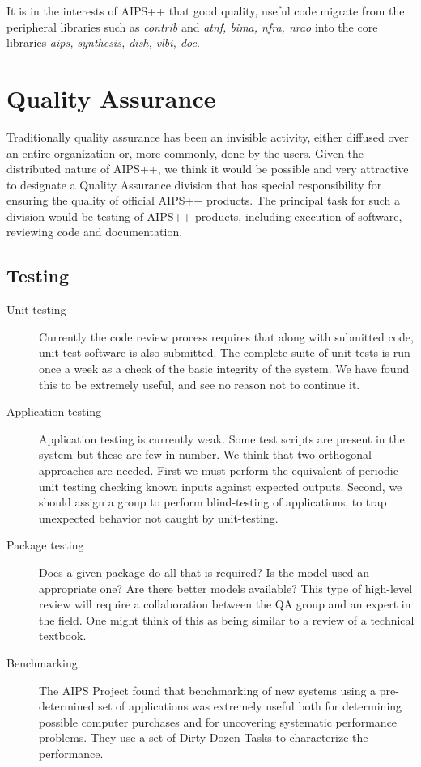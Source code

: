 It is in the interests of AIPS++ that good quality, useful code
migrate from the peripheral libraries such as {\em contrib} and {\em
atnf, bima, nfra, nrao} into the core libraries {\em aips, synthesis,
dish, vlbi, doc}. 

\section{Quality Assurance}

Traditionally quality assurance has been an invisible activity, either
diffused over an entire organization or, more commonly, done by the
users. Given the distributed nature of AIPS++, we think it would be
possible and very attractive to designate a Quality Assurance division
that has special responsibility for ensuring the quality of official
AIPS++ products. The principal task for such a division would be
testing of AIPS++ products, including execution of software, reviewing
code and documentation.

\subsection{Testing}
\begin{description}
\item[Unit testing] Currently the code review process requires that
along with submitted code, unit-test software is also submitted.
The complete suite of unit tests is run once a week
as a check of the basic integrity of the system. We have found this 
to be extremely useful, and see no reason not to continue it.
\item[Application testing] Application testing is currently
weak. Some test scripts are present in the system but these are few in
number. We think that two orthogonal approaches are needed. First we
must perform the equivalent of periodic unit testing checking
known inputs against expected outputs. Second, we
should assign a group to perform blind-testing of applications,
to trap unexpected behavior not caught by unit-testing.
\item[Package testing] Does a given package do all that is
required? Is the model used an appropriate one? Are there
better models available? This type of high-level review will
require a collaboration between the QA group and an expert in
the field. One might think of this as being similar to a review
of a technical textbook.
\item[Benchmarking] The AIPS Project found that benchmarking of
new systems using a pre-determined set of applications was
extremely useful both for determining possible computer purchases
and for uncovering systematic performance problems. They use a 
set of Dirty Dozen Tasks to characterize the performance.
\end{description}

